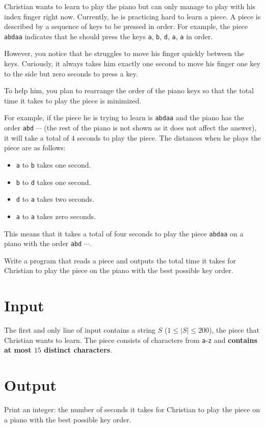 \noindent

Christian wants to learn to play the piano but can only manage to play with
his index finger right now. Currently, he is practicing hard to learn a piece.
A piece is described by a sequence of keys to be pressed in order. For example,
the piece \texttt{abdaa} indicates that he should press the keys \texttt{a},
\texttt{b}, \texttt{d}, \texttt{a}, \texttt{a} in order.

However, you notice that he struggles to move his finger quickly between the keys.
Curiously, it always takes him exactly one second to move his finger one key
to the side but zero seconds to press a key.

To help him, you plan to rearrange the order of the piano keys so that the total
time it takes to play the piece is minimized.

For example, if the piece he is trying to learn is \texttt{abdaa} and the piano
has the order \texttt{abd} $\cdots$ (the rest of the piano is not shown as it
does not affect the answer), it will take a total of $4$ seconds to play the piece.
The distances when he plays the piece are as follows:
\begin{itemize}
  \item \texttt{a} to \texttt{b} takes one second.
  \item \texttt{b} to \texttt{d} takes one second.
  \item \texttt{d} to \texttt{a} takes two seconds.
  \item \texttt{a} to \texttt{a} takes zero seconds.
\end{itemize}

This means that it takes a total of four seconds to play the piece \texttt{abdaa}
on a piano with the order \texttt{abd} $\cdots$.

Write a program that reads a piece and outputs the total time it takes for Christian
to play the piece on the piano with the best possible key order.

\section*{Input}
The first and only line of input contains a string $S$ ($1 \leq |S| \leq 200$), the piece
that Christian wants to learn. The piece consists of characters from \texttt{a}-\texttt{z}
and \textbf{contains at most $15$ distinct characters}. 

\section*{Output}
Print an integer: the number of seconds it takes for Christian to play the piece on a piano
with the best possible key order.

